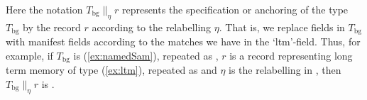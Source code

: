 Here the notation $T_{\mathrm{bg}}\parallel_\eta r$ represents the
specification or anchoring of the type $T_{\mathrm{bg}}$ by the record $r$
according to the relabelling $\eta$.  That is, we replace fields in
$T_{\mathrm{bg}}$ with manifest fields according to the matches we
have in the `ltm'-field.  Thus, for example, if $T_{\mathrm{bg}}$ is
(\ref{ex:namedSam}), repeated as , $r$ is a record
representing long term memory of type (\ref{ex:ltm}), repeated as
 and $\eta$ is the relabelling in , then
$T_{\mathrm{bg}}\parallel_\eta r$ is .
\begin{ex} 
\begin{subex} 
 
\item {} 
 
\item {}


\end{subex}
\end{ex}
